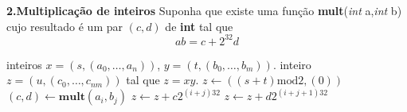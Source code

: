 \documentclass{beamer}
\begin{document}
\begin{frame}[fragile]{\bf 2.}{\bf Multiplicação de inteiros}
Suponha que existe uma função {\bf mult}({\it int} a,{\it int} b) cujo resultado é um par $(c,d)$ de {\bf int} tal que 
$$ab = c + 2^{32}d$$

\begin{algorithmic}
\REQUIRE inteiros $x=(s,(a_0,\ldots, a_n))$, $y=(t,(b_0,\ldots, b_m))$.
\ENSURE inteiro $z=(u, (c_0, \ldots, c_{nm}))$ tal que $z=xy$.
\STATE $z \leftarrow ( (s+t)\mathrm{mod} 2, (0))$ 
  \STATE $(c,d)\leftarrow {\mathbf{mult}}(a_i,b_j)$
  \STATE $z \leftarrow z + c 2^{(i+j)32}$
  \STATE $z \leftarrow z + d 2^{(i+j+1)32}$
 \ENDFOR
\ENDFOR
\end{algorithmic}

\end{frame}
\end{document}
